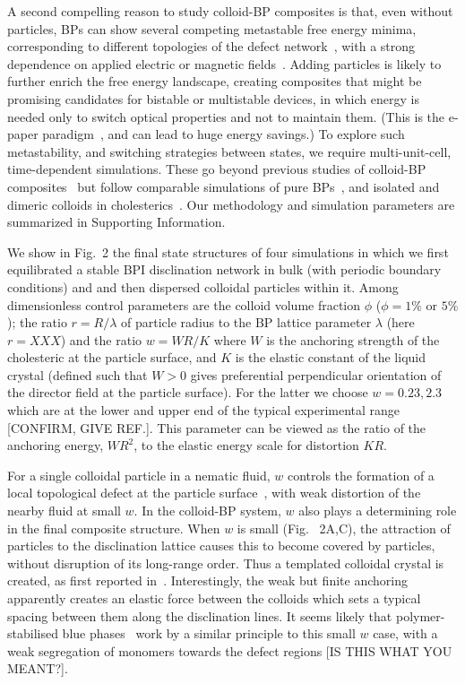 \documentclass[12pt]{article}
\begin{document}
A second compelling reason to study colloid-BP composites is that, even without particles, BPs can show several competing metastable free energy minima,
corresponding to different topologies of the defect network~\cite{adriano}, with a strong dependence on applied electric or magnetic fields~\cite{henrichfield}.
% 
Adding particles is likely to further enrich the free energy landscape, creating composites that might be promising candidates for bistable or multistable devices, in which energy is needed only to switch optical properties and not to maintain them. (This is the e-paper paradigm~\cite{epaper}, and can lead to huge energy savings.)
To explore such metastability, and switching strategies between states, we require multi-unit-cell, time-dependent simulations. These go beyond previous studies of colloid-BP composites~\cite{miha} but follow comparable simulations of pure BPs~\cite{domaingrowth,bp3,henrichfield}, and isolated and dimeric colloids in cholesterics~\cite{juho1,juho2}. Our methodology and simulation parameters are summarized in Supporting Information.

We show in Fig.~2 the final state structures of four simulations in which we first equilibrated a stable BPI disclination network in bulk (with periodic boundary conditions) and and then dispersed colloidal particles within it. Among dimensionless control parameters are the colloid volume fraction $\phi$  ($\phi = 1\%$ or $5\%$); the ratio $r = R/\lambda$ of particle radius to the BP lattice parameter $\lambda$ (here $r=XXX$) and the ratio $w = WR/K$ where $W$ is the anchoring strength of the cholesteric at the particle surface, and $K$ is the elastic constant of the liquid crystal (defined such that $W>0$ gives preferential perpendicular orientation of the director field at the particle surface). For the latter we choose $w = 0.23, 2.3$ which are at the lower and upper end of the typical experimental range [CONFIRM, GIVE REF.]. This parameter can be viewed as the ratio of the anchoring energy, $WR^2$, to the elastic energy scale for distortion $KR$. 

For a single colloidal particle
in a nematic fluid, $w$ controls the formation of a local topological defect at the particle surface~\cite{stark}, with weak distortion of the nearby fluid at small $w$. In the colloid-BP system, $w$ also plays a determining role in the final composite structure. When $w$ is small (Fig.~ 2A,C), the attraction of particles to the disclination lattice causes this to become covered by particles, without disruption of its long-range order. Thus a templated colloidal crystal is created, as first reported in~\cite{miha}. Interestingly, the weak but finite anchoring apparently creates an elastic force between the colloids which sets a typical spacing between them along the disclination lines. It seems likely that polymer-stabilised  blue phases~\cite{kikuchi} 
work by a similar principle to this small $w$ case, with a weak segregation of monomers towards the defect regions [IS THIS WHAT YOU MEANT?].
\end{document}
